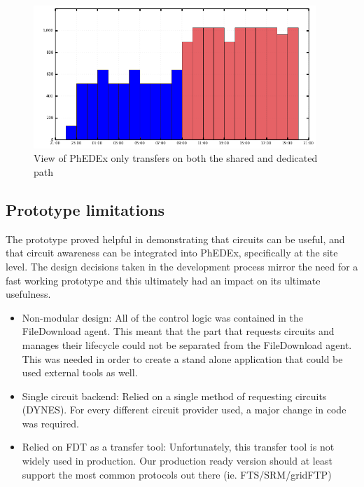 \begin{figure}[h]
  \centering
  \includegraphics[width=0.95\textwidth]{Figures/FileDownload_PhEDEx_all_paths.png}
  \caption{View of PhEDEx only transfers on both the shared and dedicated path}
  \label{fig:combined_phedex_transfers}
\end{figure} 

\subsection{Prototype limitations}

The prototype proved helpful in demonstrating that circuits can be useful, and that circuit 
awareness can be integrated into PhEDEx, specifically at the site level. The design decisions 
taken in the development process mirror the need for a fast working prototype and this 
ultimately had an impact on its ultimate usefulness.

\begin{itemize}
  \item Non-modular design: All of the control logic was contained in the FileDownload agent.
  This meant that the part that requests circuits and manages their lifecycle could not be 
  separated from the FileDownload agent. This was needed in order to create a stand alone 
  application that could be used external tools as well.
  \item Single circuit backend: Relied on a single method of requesting circuits (DYNES\cite{DYNES}). 
  For every different circuit provider used, a major change in code was required.
  \item Relied on FDT as a transfer tool: Unfortunately, this transfer tool is not widely used
  in production. Our production ready version should at least support the most common protocols
  out there (ie. FTS/SRM/gridFTP)
\end{itemize}

